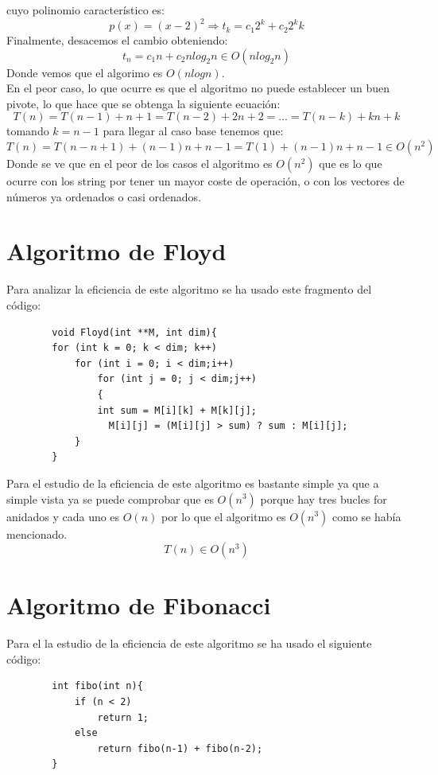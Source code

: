 \documentclass[11pt,openany]{book}
\begin{document}
cuyo polinomio característico es: $$p(x)=(x-2)^2 \Rightarrow t_k=c_1 2^k + c_2 2^k k$$
Finalmente, desacemos el cambio obteniendo:
\begin{equation*}
    t_n = c_1 n + c_2 n log_2 n \in O(nlog_2 n)
\end{equation*}
Donde vemos que el algorimo es $O(nlog n)$.\\
En el peor caso, lo que ocurre es que el algoritmo no puede establecer un buen pivote, lo que hace que se obtenga la siguiente
ecuación:
\begin{equation*}
    T(n)=T(n-1)+n+1= T(n-2)+2n+2=...=T(n-k)+kn+k
\end{equation*}
tomando $k=n-1$ para llegar al caso base tenemos que:
\begin{equation*}
    T(n)=T(n-n+1)+(n-1)n+n-1=T(1)+(n-1)n+n-1 \in O(n^2)
\end{equation*}
Donde se ve que en el peor de los casos el algoritmo es $O(n^2)$ que es lo que ocurre con los string por tener un mayor coste de
operación, o con los vectores de números ya ordenados o casi ordenados.

\section*{Algoritmo de Floyd}
Para analizar la eficiencia de este algoritmo se ha usado este fragmento del código:
\begin{lstlisting}
        void Floyd(int **M, int dim){
        for (int k = 0; k < dim; k++)
            for (int i = 0; i < dim;i++)
                for (int j = 0; j < dim;j++)
                {
                int sum = M[i][k] + M[k][j];    	
                  M[i][j] = (M[i][j] > sum) ? sum : M[i][j];
            }
        }	     	
        \end{lstlisting}
Para el estudio de la eficiencia de este algoritmo es bastante simple ya que a simple vista ya se puede comprobar que es $O(n^3)$ porque hay
tres bucles for anidados y cada uno es $O(n)$ por lo que el algoritmo es $O(n^3)$ como se había mencionado.
$$T(n) \in O(n^3)$$

\section*{Algoritmo de Fibonacci}
Para el la estudio de la eficiencia de este algoritmo se ha usado el siguiente código:
\begin{lstlisting}
        int fibo(int n){
            if (n < 2)
                return 1;
            else
                return fibo(n-1) + fibo(n-2);
        }
            
        \end{lstlisting}
\end{document}
